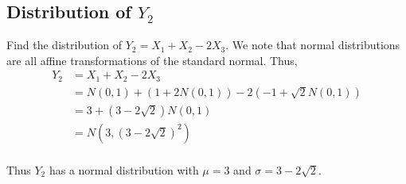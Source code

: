 \documentclass{article}
\begin{document}
\subsection{Distribution of $Y_2$}
Find the distribution of $Y_2 = X_1 + X_2 - 2X_3$. We note that normal
distributions are all affine transformations of the standard normal. Thus,
\begin{align*}
    Y_2 &= X_1 + X_2 - 2X_3 \\
    &= N(0,1) + (1 + 2 N(0,1)) - 2(-1 + \sqrt{2} N(0,1)) \\
    &= 3 + (3 - 2\sqrt{2}) N(0,1) \\
    &= N(3, (3-2\sqrt{2})^2) \\
\end{align*}

Thus $Y_2$ has a normal distribution with $\mu = 3$
and $\sigma = 3 - 2\sqrt{2}$.
\end{document}
